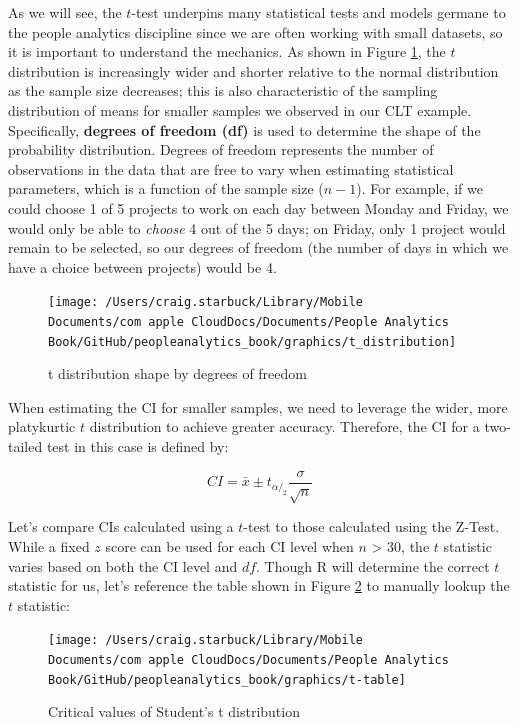 \documentclass[
]{book}
\begin{document}
As we will see, the \(t\)-test underpins many statistical tests and models germane to the people analytics discipline since we are often working with small datasets, so it is important to understand the mechanics. As shown in Figure \ref{fig:t-distribution}, the \(t\) distribution is increasingly wider and shorter relative to the normal distribution as the sample size decreases; this is also characteristic of the sampling distribution of means for smaller samples we observed in our CLT example. Specifically, \textbf{degrees of freedom (df)} is used to determine the shape of the probability distribution. Degrees of freedom represents the number of observations in the data that are free to vary when estimating statistical parameters, which is a function of the sample size (\(n - 1\)). For example, if we could choose 1 of 5 projects to work on each day between Monday and Friday, we would only be able to \emph{choose} 4 out of the 5 days; on Friday, only 1 project would remain to be selected, so our degrees of freedom (the number of days in which we have a choice between projects) would be 4.

\begin{figure}

{\centering \texttt{[image: /Users/craig.starbuck/Library/Mobile Documents/com~apple~CloudDocs/Documents/People Analytics Book/GitHub/peopleanalytics\_book/graphics/t\_distribution]} 

}

\caption{t distribution shape by degrees of freedom}\label{fig:t-distribution}
\end{figure}

When estimating the CI for smaller samples, we need to leverage the wider, more platykurtic \(t\) distribution to achieve greater accuracy. Therefore, the CI for a two-tailed test in this case is defined by:

\[ CI = \bar{x} \pm t_{\alpha/_2} \frac{\sigma}{\sqrt{n}} \]

Let's compare CIs calculated using a \(t\)-test to those calculated using the Z-Test. While a fixed \(z\) score can be used for each CI level when \(n\) \textgreater{} 30, the \(t\) statistic varies based on both the CI level and \(df\). Though R will determine the correct \(t\) statistic for us, let's reference the table shown in Figure \ref{fig:t-crit} to manually lookup the \(t\) statistic:

\begin{figure}

{\centering \texttt{[image: /Users/craig.starbuck/Library/Mobile Documents/com~apple~CloudDocs/Documents/People Analytics Book/GitHub/peopleanalytics\_book/graphics/t-table]} 

}

\caption{Critical values of Student's t distribution}\label{fig:t-crit}
\end{figure}
\end{document}
